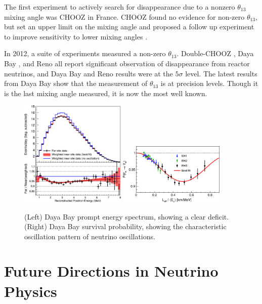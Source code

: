 The first experiment to actively search for \nuebar disappearance due to a nonzero $\theta_{13}$ mixing angle was CHOOZ \cite{Ardellier:2004ui} in France.  CHOOZ found no evidence for non-zero $\theta_{13}$, but set an upper limit on the mixing angle and proposed a follow up experiment to improve sensitivity to lower mixing angles \cite{Ardellier:2004ui}.

In 2012, a suite of experiments measured a non-zero $\theta_{13}$.  Double-CHOOZ \cite{PhysRevLett.108.131801}, Daya Bay \cite{PhysRevLett.108.171803}, and Reno \cite{PhysRevLett.108.191802} all report significant observation of \nuebar disappearance from reactor neutrinos, and Daya Bay and Reno results were at the $5\sigma$ level.  The latest results from Daya Bay \cite{An:2015rpe} show that the measurement of $\theta_{13}$ is at precision levels.  Though it is the last mixing angle measured, it is now the most well known.

\begin{figure}[htbp]
  \centering
  \includegraphics[width=0.45\textwidth]{intro_figures/daya_bay_spectrum.png}
  \includegraphics[width=0.45\textwidth]{intro_figures/daya_bay_survival.png}
  \caption[Daya Bay Oscillation Results]{(Left) Daya Bay prompt energy spectrum, showing a clear deficit. (Right) Daya Bay survival probability, showing the characteristic oscillation pattern of neutrino oscillations.}
  \label{fig:daya_bay_oscillations}
\end{figure}

\section{Future Directions in Neutrino Physics}
\label{sec:future_experiments}

